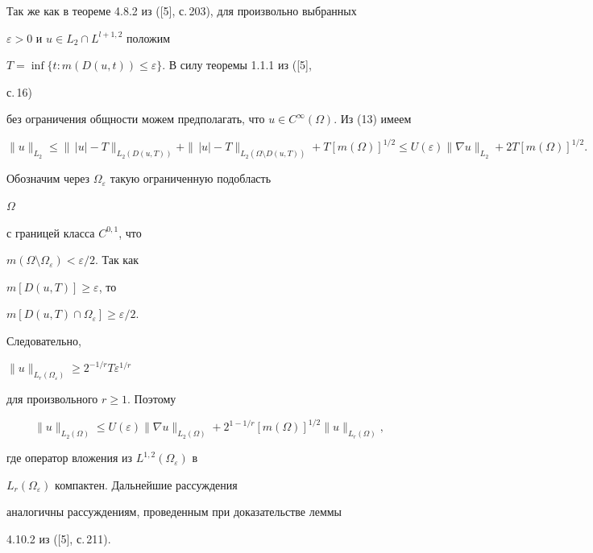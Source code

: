 \begin{pf} 


Так же как в теореме 4.8.2 из ([5], с.\,203), для произвольно выбранных  


$\varepsilon>0$ и $u\in L_2\cap L^{l+1,2}$ положим 


$T=\inf\{t:m(D(u,t))\le\varepsilon\}$. В силу теоремы 1.1.1 из ([5], 


с.\,16) 


без ограничения общности можем предполагать, что $u\in 


C^\infty(\Omega)$. Из (13) имеем 


$$ 


\|u\|_{L_2}\le\|\,|u|-T\|_{L_2(D(u,T))}+ 


\|\,|u|-T\|_{L_2(\Omega\setminus D(u,T))}+ 


T[m(\Omega)]^{1/2}\le U(\varepsilon) 


\|\nabla u\|_{L_2}+2T[m(\Omega)]^{1/2}.


$$ 


Обозначим через $\Omega_\varepsilon$ такую ограниченную подобласть


$\Omega$


с границей класса $C^{0,1}$, что


$m(\Omega\setminus\Omega_\varepsilon)<\varepsilon/2$. Так как


$m[D(u,T)]\ge\varepsilon$, то


$m[D(u,T)\cap\Omega_\varepsilon]\ge\varepsilon/2$.


Следовательно,


$\|u\|_{L_r(\Omega_\varepsilon)}\ge 2^{-1/r}T\varepsilon^{1/r}$


для произвольного $r\ge1$. Поэтому


$$


\|u\|_{L_2(\Omega)}\le U(\varepsilon)


\|\nabla u\|_{L_2(\Omega)}+2^{1-1/r}


[m(\Omega)]^{1/2}\|u\|_{L_r(\Omega)},


$$


где оператор вложения из $L^{1,2}(\Omega_\varepsilon)$ в 


$L_r(\Omega_\varepsilon)$ компактен. Дальнейшие рассуждения  


аналогичны рассуждениям, проведенным при доказательстве леммы 


4.10.2 из ([5], с.\,211).


\end{pf} 


